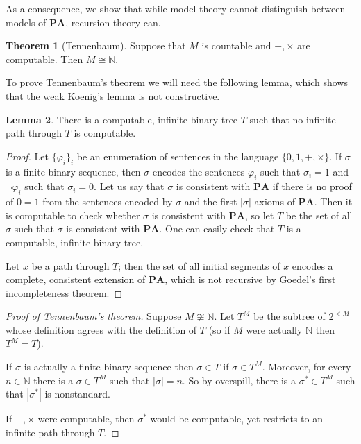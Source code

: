 \documentclass[12pt]{report}
\newcommand{\NN}{\mathbb{N}}
\newcommand{\PA}{\mathbf{PA}}
\theoremstyle{definition}
\newtheorem{theorem}{Theorem}[chapter]
\newtheorem{lemma}[theorem]{Lemma}
\begin{document}
As a consequence, we show that while model theory cannot distinguish between models of $\PA$, recursion theory can.
\begin{theorem}[Tennenbaum]
Suppose that $M$ is countable and $+,\times$ are computable. Then $M \cong \NN$.
\end{theorem}
To prove Tennenbaum's theorem we will need the following lemma, which shows that the weak Koenig's lemma is not constructive.
\begin{lemma}
There is a computable, infinite binary tree $T$ such that no infinite path through $T$ is computable.
\end{lemma}
\begin{proof}
Let $\{\varphi_i\}_i$ be an enumeration of sentences in the language $\{0, 1, +, \times\}$. If $\sigma$ is a finite binary sequence, then $\sigma$ encodes the sentences $\varphi_i$ such that $\sigma_i = 1$ and $\neg \varphi_i$ such that $\sigma_i = 0$.
Let us say that $\sigma$ is consistent with $\PA$ if there is no proof of $0 = 1$ from the sentences encoded by $\sigma$ and the first $|\sigma|$ axioms of $\PA$.
Then it is computable to check whether $\sigma$ is consistent with $\PA$, so let $T$ be the set of all $\sigma$ such that $\sigma$ is consistent with $\PA$. One can easily check that $T$ is a computable, infinite binary tree.

Let $x$ be a path through $T$; then the set of all initial segments of $x$ encodes a complete, consistent extension of $\PA$, which is not recursive by Goedel's first incompleteness theorem.
\end{proof}

\begin{proof}[Proof of Tennenbaum's theorem]
Suppose $M \not \cong \NN$. Let $T^M$ be the subtree of $2^{<M}$ whose definition agrees with the definition of $T$ (so if $M$ were actually $\NN$ then $T^M = T$).

If $\sigma$ is actually a finite binary sequence then $\sigma \in T$ if $\sigma \in T^M$. Moreover, for every $n \in \NN$ there is a $\sigma \in T^M$ such that $|\sigma| = n$. So by overspill, there is a $\sigma^* \in T^M$ such that $|\sigma^*|$ is nonstandard.

If $+,\times$ were computable, then $\sigma^*$ would be computable, yet restricts to an infinite path through $T$.
\end{proof}
\end{document}
